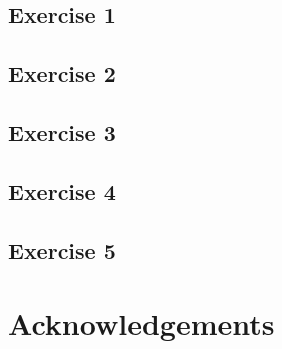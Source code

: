 \documentclass[10pt]{article}
\begin{document}
\subsection{Exercise 1}
\subsection{Exercise 2}
\subsection{Exercise 3}
\subsection{Exercise 4}
\subsection{Exercise 5}

\section{Acknowledgements}
\end{document}
